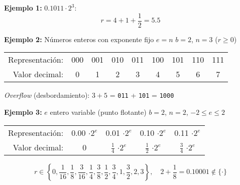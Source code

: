 \documentclass[9pt, aspectratio=169]{beamer}
\begin{document}
\begin{frame}
\textbf{Ejemplo 1:} $0.1011 \cdot 2^3$:
\[ r = 4 + 1 + \frac{1}{2} = 5.5 \]
\bigskip \pause

\textbf{Ejemplo 2:} Números enteros con exponente fijo $e = n$ $b = 2$, $n = 3$ ($r \geq 0$)

\begin{center}
\begin{tabular}{rcccccccc}
\toprule
Representación: & 000 & 001 & 010 & 011 & 100 & 101 & 110 & 111 \\
Valor decimal: & 0 & 1 & 2 & 3 & 4 & 5 & 6 & 7 \\
\bottomrule
\end{tabular}
\end{center}

\textit{Overflow} (desbordamiento): $3 + 5$ = \texttt{011} +  \texttt{101} = \alert{\texttt{1000}}
\bigskip \pause

\textbf{Ejemplo 3:} $e$ entero variable (punto flotante) $b = 2$, $n = 2$, $-2 \leq e \leq 2$
\begin{center}
\begin{tabular}{rcccc}
\toprule
Representación: & 0.00 $\cdot 2^e$ & 0.01 $\cdot 2^e$ & 0.10 $\cdot 2^e$ & 0.11 $\cdot 2^e$ \\
Valor decimal: & 0 & $\frac{1}{4}$ $\cdot 2^e$  & $\frac{1}{2}$ $\cdot 2^e$ & $\frac{3}{4}$ $\cdot 2^e$ \\
\bottomrule
\end{tabular}
\end{center}
\[ r \in \left\{0, \frac{1}{16}, \frac{1}{8}, \frac{3}{16}, \frac{1}{4}, \frac{3}{8}, \frac{1}{2}, \frac{3}{4}, 1, \frac{3}{2}, 2, 3 \right\}, \quad 2 + \frac{1}{8} = 0.10001 \notin \{ \cdot \} \]
\end{frame}
\end{document}
